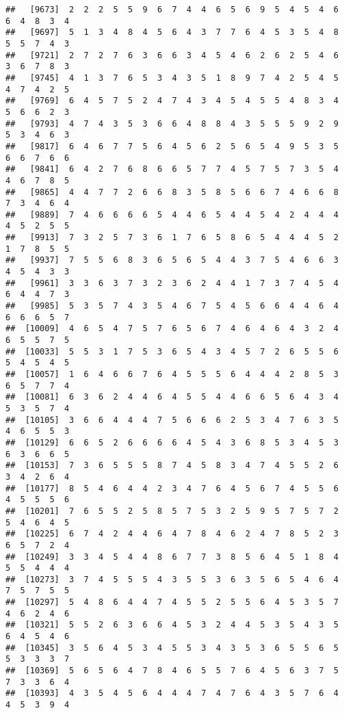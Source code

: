 \documentclass[
]{book}
\begin{document}
\begin{verbatim}
##   [9673]  2  2  2  5  5  9  6  7  4  4  6  5  6  9  5  4  5  4  6  6  4  8  3  4
##   [9697]  5  1  3  4  8  4  5  6  4  3  7  7  6  4  5  3  5  4  8  5  5  7  4  3
##   [9721]  2  7  2  7  6  3  6  6  3  4  5  4  6  2  6  2  5  4  6  3  6  7  8  3
##   [9745]  4  1  3  7  6  5  3  4  3  5  1  8  9  7  4  2  5  4  5  4  7  4  2  5
##   [9769]  6  4  5  7  5  2  4  7  4  3  4  5  4  5  5  4  8  3  4  5  6  6  2  3
##   [9793]  4  7  4  3  5  3  6  6  4  8  8  4  3  5  5  5  9  2  9  5  3  4  6  3
##   [9817]  6  4  6  7  7  5  6  4  5  6  2  5  6  5  4  9  5  3  5  6  6  7  6  6
##   [9841]  6  4  2  7  6  8  6  6  5  7  7  4  5  7  5  7  3  5  4  4  6  7  8  5
##   [9865]  4  4  7  7  2  6  6  8  3  5  8  5  6  6  7  4  6  6  8  7  3  4  6  4
##   [9889]  7  4  6  6  6  6  5  4  4  6  5  4  4  5  4  2  4  4  4  4  5  2  5  5
##   [9913]  7  3  2  5  7  3  6  1  7  6  5  8  6  5  4  4  4  5  2  1  7  8  5  5
##   [9937]  7  5  5  6  8  3  6  5  6  5  4  4  3  7  5  4  6  6  3  4  5  4  3  3
##   [9961]  3  3  6  3  7  3  2  3  6  2  4  4  1  7  3  7  4  5  4  6  4  4  7  3
##   [9985]  5  3  5  7  4  3  5  4  6  7  5  4  5  6  6  4  4  6  4  6  6  6  5  7
##  [10009]  4  6  5  4  7  5  7  6  5  6  7  4  6  4  6  4  3  2  4  6  5  5  7  5
##  [10033]  5  5  3  1  7  5  3  6  5  4  3  4  5  7  2  6  5  5  6  5  4  5  4  5
##  [10057]  1  6  4  6  6  7  6  4  5  5  5  6  4  4  4  2  8  5  3  6  5  7  7  4
##  [10081]  6  3  6  2  4  4  6  4  5  5  4  4  6  6  5  6  4  3  4  5  3  5  7  4
##  [10105]  3  6  6  4  4  4  7  5  6  6  6  2  5  3  4  7  6  3  5  4  6  5  5  3
##  [10129]  6  6  5  2  6  6  6  6  4  5  4  3  6  8  5  3  4  5  3  6  3  6  6  5
##  [10153]  7  3  6  5  5  5  8  7  4  5  8  3  4  7  4  5  5  2  6  3  4  2  6  4
##  [10177]  8  5  4  6  4  4  2  3  4  7  6  4  5  6  7  4  5  5  6  4  5  5  5  6
##  [10201]  7  6  5  5  2  5  8  5  7  5  3  2  5  9  5  7  5  7  2  5  4  6  4  5
##  [10225]  6  7  4  2  4  4  6  4  7  8  4  6  2  4  7  8  5  2  3  6  5  7  2  4
##  [10249]  3  3  4  5  4  4  8  6  7  7  3  8  5  6  4  5  1  8  4  5  5  4  4  4
##  [10273]  3  7  4  5  5  5  4  3  5  5  3  6  3  5  6  5  4  6  4  7  5  7  5  5
##  [10297]  5  4  8  6  4  4  7  4  5  5  2  5  5  6  4  5  3  5  7  4  6  2  4  6
##  [10321]  5  5  2  6  3  6  6  4  5  3  2  4  4  5  3  5  4  3  5  6  4  5  4  6
##  [10345]  3  5  6  4  5  3  4  5  5  3  4  3  5  3  6  5  5  6  5  5  3  3  3  7
##  [10369]  5  6  5  6  4  7  8  4  6  5  5  7  6  4  5  6  3  7  5  7  3  3  6  4
##  [10393]  4  3  5  4  5  6  4  4  4  7  4  7  6  4  3  5  7  6  4  4  5  3  9  4

\end{verbatim}
\end{document}
